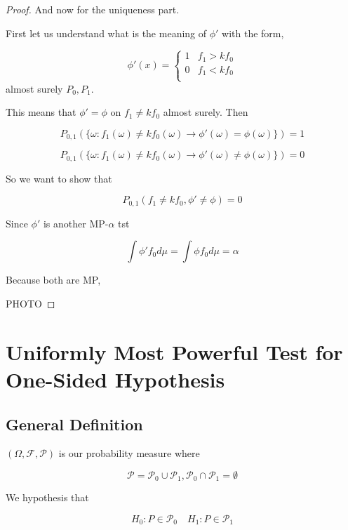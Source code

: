 \documentclass[11pt,fleqn]{book} %
\begin{document}
\begin{proof}
 And now for the uniqueness part. 

 First let us understand what is the meaning of $\phi'$ with the form, 

 			$$\phi'(x) = \left\{\begin{array}{ll}
 				1 & f_1 > k f_0\\
 				0 & f_1 < k f_0\\
 			\end{array} \right. $$
 almost surely $P_0, P_1$. 

 This means that $\phi' = \phi$ on $f_1 \neq k f_0$ almost surely. Then 

 		$$P_{0,1}(\{\omega: f_1(\omega) \neq k f_0(\omega) \rightarrow \phi'(\omega) = \phi(\omega) \}) = 1 $$

 		$$P_{0,1}(\{\omega: f_1(\omega) \neq k f_0(\omega) \rightarrow \phi'(\omega) \neq \phi(\omega) \}) = 0 $$

So we want to show that 

		$$P_{0, 1}( f_1 \neq k f_0, \phi' \neq \phi) = 0 $$

Since $\phi'$ is another MP-$\alpha$ tst

		$$\int \phi' f_0 d\mu = \int \phi f_0 d\mu = \alpha $$

Because both are MP, 

		PHOTO


 \end{proof}


 \section{Uniformly Most Powerful Test for One-Sided Hypothesis}

 \subsection{General Definition}

 $(\Omega, \mathcal{F}, \mathcal{P})$ is our probability measure where

 		$$\mathcal{P} = \mathcal{P}_0 \cup \mathcal{P}_1,  \mathcal{P}_0 \cap \mathcal{P}_1 = \emptyset$$

 We hypothesis that

 		$$H_0: P \in \mathcal{P}_0 \quad H_1: P \in \mathcal{P}_1 $$
\end{document}
